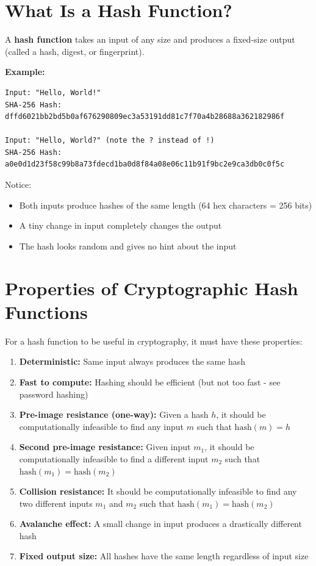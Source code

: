 \documentclass[11pt,a4paper]{report}
\begin{document}
\section{What Is a Hash Function?}

A \textbf{hash function} takes an input of any size and produces a fixed-size output (called a hash, digest, or fingerprint).

\textbf{Example:}
\begin{verbatim}
Input: "Hello, World!"
SHA-256 Hash: 
dffd6021bb2bd5b0af676290809ec3a53191dd81c7f70a4b28688a362182986f

Input: "Hello, World?" (note the ? instead of !)
SHA-256 Hash: 
a0e0d1d23f58c99b8a73fdecd1ba0d8f84a08e06c11b91f9bc2e9ca3db0c0f5c
\end{verbatim}

Notice:
\begin{itemize}
\item Both inputs produce hashes of the same length (64 hex characters = 256 bits)
\item A tiny change in input completely changes the output
\item The hash looks random and gives no hint about the input
\end{itemize}

\section{Properties of Cryptographic Hash Functions}

For a hash function to be useful in cryptography, it must have these properties:

\begin{enumerate}
\item \textbf{Deterministic:} Same input always produces the same hash

\item \textbf{Fast to compute:} Hashing should be efficient (but not too fast - see password hashing)

\item \textbf{Pre-image resistance (one-way):} Given a hash $h$, it should be computationally infeasible to find any input $m$ such that $\text{hash}(m) = h$

\item \textbf{Second pre-image resistance:} Given input $m_1$, it should be computationally infeasible to find a different input $m_2$ such that $\text{hash}(m_1) = \text{hash}(m_2)$

\item \textbf{Collision resistance:} It should be computationally infeasible to find any two different inputs $m_1$ and $m_2$ such that $\text{hash}(m_1) = \text{hash}(m_2)$

\item \textbf{Avalanche effect:} A small change in input produces a drastically different hash

\item \textbf{Fixed output size:} All hashes have the same length regardless of input size
\end{enumerate}
\end{document}
